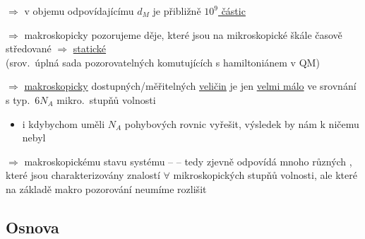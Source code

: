 $\Rightarrow$ v  objemu odpovídajícímu $d_M$ je přibližně \underline{$10^9$ částic}

$\Rightarrow$ makroskopicky pozorujeme děje, které jsou na mikroskopické škále časově středované $\Rightarrow$ \underline{statické} \\
\quad (srov.\ úplná sada pozorovatelných komutujících s hamiltoniánem v QM)

$\Rightarrow$ \underline{makroskopicky} dostupných/měřitelných \underline{veličin} je jen \underline{velmi málo} ve srovnání s typ.\ $6N_A$ mikro.\ stupňů volnosti
\begin{itemize}
  \item i kdybychom uměli $N_A$ pohybových rovnic vyřešit, výsledek by nám k ničemu nebyl
\end{itemize}

\begin{veta}
$\Rightarrow$ makroskopickému stavu systému --   -- tedy zjevně odpovídá mnoho různých  , které jsou charakterizovány znalostí $\forall$ mikroskopických stupňů volnosti, ale které na základě makro pozorování neumíme rozlišit
\end{veta}

\subsection{Osnova}

